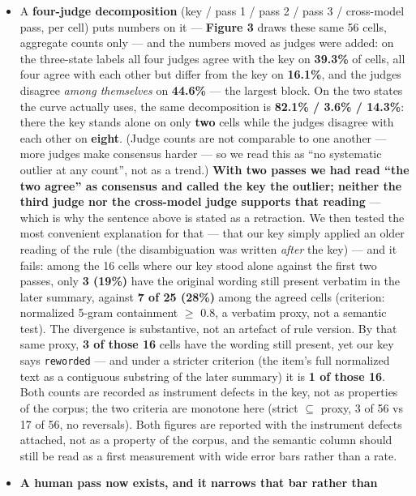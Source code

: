 \documentclass[
]{article}
\begin{document}
\begin{itemize}
  rule) came out \textbf{5 of 7 cells}.
\item
  A \textbf{four-judge decomposition} (key / pass 1 / pass 2 / pass 3 /
  cross-model pass, per cell) puts numbers on it --- \textbf{Figure 3}
  draws these same 56 cells, aggregate counts only --- and the numbers
  moved as judges were added: on the three-state labels all four judges
  agree with the key on \textbf{39.3\%} of cells, all four agree with
  each other but differ from the key on \textbf{16.1\%}, and the judges
  disagree \emph{among themselves} on \textbf{44.6\%} --- the largest
  block. On the two states the curve actually uses, the same
  decomposition is \textbf{82.1\% / 3.6\% / 14.3\%}: there the key
  stands alone on only \textbf{two} cells while the judges disagree with
  each other on \textbf{eight}. (Judge counts are not comparable to one
  another --- more judges make consensus harder --- so we read this as
  ``no systematic outlier at any count'', not as a trend.) \textbf{With
  two passes we had read ``the two agree'' as consensus and called the
  key the outlier; neither the third judge nor the cross-model judge
  supports that reading} --- which is why the sentence above is stated
  as a retraction. We then tested the most convenient explanation for
  that --- that our key simply applied an older reading of the rule (the
  disambiguation was written \emph{after} the key) --- and it fails:
  among the 16 cells where our key stood alone against the first two
  passes, only \textbf{3 (19\%)} have the original wording still present
  verbatim in the later summary, against \textbf{7 of 25 (28\%)} among
  the agreed cells (criterion: normalized 5-gram containment
  \ensuremath{\geq} 0.8, a verbatim proxy, not a semantic test). The
  divergence is substantive, not an artefact of rule version. By that
  same proxy, \textbf{3 of those 16} cells have the wording still
  present, yet our key says \texttt{reworded} --- and under a stricter
  criterion (the item's full normalized text as a contiguous substring
  of the later summary) it is \textbf{1 of those 16}. Both counts are
  recorded as instrument defects in the key, not as properties of the
  corpus; the two criteria are monotone here (strict
  \ensuremath{\subseteq} proxy, 3 of 56 vs 17 of 56, no reversals). Both
  figures are reported with the instrument defects attached, not as a
  property of the corpus, and the semantic column should still be read
  as a first measurement with wide error bars rather than a rate.
\item
  \textbf{A human pass now exists, and it narrows that bar rather than
}
\end{itemize}
\end{document}
